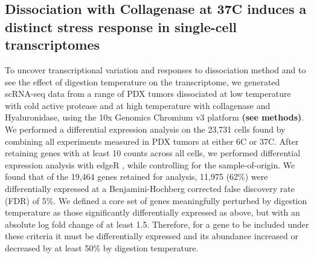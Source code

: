 \subsection{Dissociation with Collagenase at 37\textdegree C induces a distinct stress response in single-cell transcriptomes}
To uncover transcriptional variation and responses to dissociation method and to see the effect of digestion temperature on the transcriptome, we generated scRNA-seq data from a range of PDX tumors dissociated at low temperature with cold active protease and at high temperature with collagenase and Hyaluronidase, using the 10x Genomics Chromium v3 platform \textbf{(see methods)}.
We performed a differential expression analysis on the 23,731 cells found by combining all experiments measured in PDX tumors at either 6\textdegree C or 37\textdegree C. After retaining genes with at least 10 counts across all cells, we performed differential expression analysis with edgeR \cite{robinson2010edger}, while controlling for the sample-of-origin.
We found that of the 19,464 genes retained for analysis, 11,975 (62\%) were differentially expressed at a Benjamini-Hochberg corrected false discovery rate (FDR) of 5\%. We defined a core set of genes meaningfully perturbed by digestion temperature as those significantly differentially expressed as above, but with an absolute log fold change of at least 1.5. Therefore, for a gene to be included under these criteria it must be differentially expressed and its abundance increased or decreased by at least 50\% by digestion temperature. 


